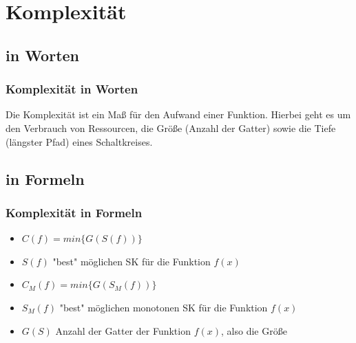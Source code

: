 \documentclass[hyperref={pdfpagelabels=false}]{beamer} %
\begin{document}
  \section{Komplexität}
  \subsection*{in Worten}
    \begin{frame}%
    \frametitle{Komplexität in Worten}
    Die Komplexität ist ein Maß für den Aufwand einer Funktion.
    Hierbei geht es um den Verbrauch von Ressourcen, die Größe (Anzahl der Gatter) sowie die Tiefe (längster Pfad)
    eines Schaltkreises.\\
  \end{frame}

  \subsection*{in Formeln}
  \begin{frame}
    \frametitle{Komplexität in Formeln}
    \begin{itemize}
      \item $C(f) = min \{G(S(f))\}$
      \item $S(f)$ "best" möglichen SK für die Funktion $f(x)$
      \item $C_M(f) = min \{G(S_M(f))\}$
      \item $S_M(f)$ "best" möglichen monotonen SK für die Funktion $f(x)$
      \item $G(S)$ Anzahl der Gatter der Funktion $f(x)$, also die Größe
    \end{itemize}
%
  \end{frame}
\end{document}
